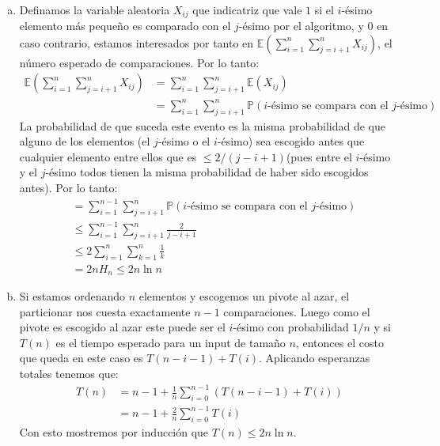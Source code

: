 \documentclass[dcc,uchile]{fcfmcourse}
\theoremstyle{plain}
\theoremstyle{definition}
\begin{document}
\begin{problems}
\\
\begin{enumerate}[a)]
    \item Definamos la variable aleatoria $X_{ij}$ que indicatriz que vale $1$ si el $i$-ésimo elemento más pequeño es comparado con el $j$-ésimo por el algoritmo, y $0$ en caso contrario, estamos interesados por tanto en $\mathbb{E}\left(\sum_{i=1}^{n}\sum_{j=i+1}^{n}X_{ij}\right)$, el número esperado de comparaciones. Por lo tanto:
    \begin{align*}
    \mathbb{E}\left(\sum_{i=1}^{n}\sum_{j=i+1}^{n}X_{ij}\right) &= \sum_{i=1}^{n}\sum_{j=i+1}^{n}\mathbb{E}(X_{ij})\\
    &= \sum_{i=1}^{n}\sum_{j=i+1}^{n} \mathbb{P}(\text{$i$-ésimo se compara con el $j$-ésimo})
    \end{align*}
    La probabilidad de que suceda este evento es la misma probabilidad de que alguno de los elementos (el $j$-ésimo o el $i$-ésimo) sea escogido antes que cualquier elemento entre ellos que es $\le 2/(j-i+1)$(pues entre el $i$-ésimo y el $j$-ésimo todos tienen la misma probabilidad de haber sido escogidos antes). Por lo tanto:
    \begin{align*}
        &= \sum_{i=1}^{n-1}\sum_{j=i+1}^{n} \mathbb{P}(\text{$i$-ésimo se compara con el $j$-ésimo}) \\
        &\le \sum_{i=1}^{n-1}\sum_{j=i+1}^{n} \frac{2}{j-i+1}\\
        &\le 2\sum_{i=1}^{n}\sum_{k=1}^{n}\frac{1}{k}\\
        &= 2n H_{n} \le 2n\ln{n}
    \end{align*}
    \item Si estamos ordenando $n$ elementos y escogemos un pivote al azar, el particionar nos cuesta exactamente $n-1$ comparaciones. Luego como el pivote es escogido al azar este puede ser el $i$-ésimo con probabilidad $1/n$ y si $T(n)$ es el tiempo esperado para un input de tamaño $n$, entonces el costo que queda en este caso es $T(n-i-1) + T(i)$. Aplicando esperanzas totales tenemos que:
    \begin{align*}
        T(n) &= n-1 + \frac{1}{n}\sum_{i=0}^{n-1}(T(n-i-1) + T(i))\\
        &= n-1 + \frac{2}{n}\sum_{i=0}^{n-1}T(i)
    \end{align*}
    Con esto mostremos por inducción que $T(n) \le 2n\ln{n}$.\\
    \begin{align*}

\end{align*}
\end{enumerate}
\end{problems}
\end{document}
